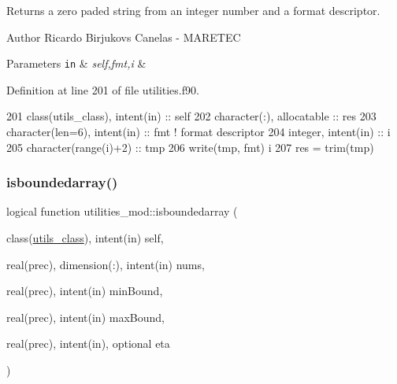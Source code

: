 Returns a zero paded string from an integer number and a format descriptor. 

\begin{DoxyAuthor}{Author}
Ricardo Birjukovs Canelas -\/ M\+A\+R\+E\+T\+EC 
\end{DoxyAuthor}

\begin{DoxyParams}[1]{Parameters}
\mbox{\tt in}  & {\em self,fmt,i} & \\
\hline
\end{DoxyParams}


Definition at line 201 of file utilities.\+f90.


\begin{DoxyCode}
201     \textcolor{keywordtype}{class}(utils\_class), \textcolor{keywordtype}{intent(in)} :: self
202     \textcolor{keywordtype}{character(:)}, \textcolor{keywordtype}{allocatable} :: res
203     \textcolor{keywordtype}{character(len=6)}, \textcolor{keywordtype}{intent(in)} :: fmt \textcolor{comment}{! format descriptor}
204     \textcolor{keywordtype}{integer}, \textcolor{keywordtype}{intent(in)} :: i
205     \textcolor{keywordtype}{character(range(i)+2)} :: tmp
206     \textcolor{keyword}{write}(tmp, fmt) i
207     res = trim(tmp)
\end{DoxyCode}
\mbox{\label{namespaceutilities__mod_a1d16eada2f4cb344ad1500b3edba43fa}} 
\subsubsection{\texorpdfstring{isboundedarray()}{isboundedarray()}}
{\footnotesize\ttfamily logical function utilities\+\_\+mod\+::isboundedarray (\begin{DoxyParamCaption}\item[{class(\mbox{\hyperlink{structutilities__mod_1_1utils__class}{utils\+\_\+class}}), intent(in)}]{self,  }\item[{real(prec), dimension(\+:), intent(in)}]{nums,  }\item[{real(prec), intent(in)}]{min\+Bound,  }\item[{real(prec), intent(in)}]{max\+Bound,  }\item[{real(prec), intent(in), optional}]{eta }\end{DoxyParamCaption})\hspace{0.3cm}{\ttfamily [private]}}



